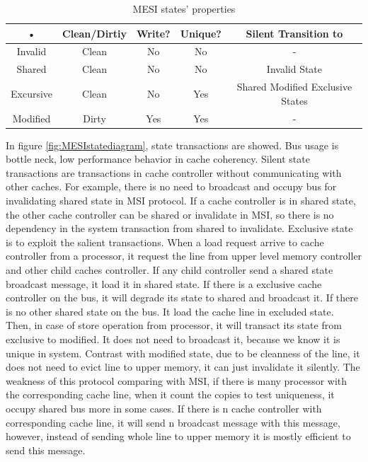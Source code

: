        \begin{table}[position specifier]
            \centering
            \begin{tabular}{|c|c|c|c|c|}
                \hline 
                • & Clean/Dirtiy & Write? & Unique? & Silent Transition to \\ 
                \hline 
                Invalid & Clean & No & No & - \\ 
                \hline 
                Shared & Clean & No & No & Invalid State \\ 
                \hline 
                Excursive & Clean & No & Yes & Shared Modified Exclusive States \\ 
                \hline 
                Modified & Dirty & Yes & Yes & - \\ 
                \hline 
            \end{tabular} 
            \caption{MESI states' properties}
            \label{tab:MESItable}
        \end{table}

        In figure \ref{fig:MESIstatediagram}, state transactions are showed. Bus usage is bottle neck, low performance behavior in cache coherency. Silent state transactions are transactions in cache controller without communicating with other caches. For example, there is no need to broadcast and occupy bus for invalidating shared state in MSI protocol. If a cache controller is in shared state, the other cache controller can be shared or invalidate in MSI, so there is no dependency in the system transaction from shared to invalidate. Exclusive state is to exploit the salient transactions. When a load request arrive to cache controller from a processor, it request the line from upper level memory controller and other child caches controller. If any child controller send a shared state broadcast message, it load it in shared state. If there is a exclusive cache controller on the bus, it will degrade its state to shared and broadcast it. If there is no other shared state on the bus. It load the cache line in excluded state. Then, in case of store operation from processor, it will transact its state from exclusive to modified. It does not need to broadcast it, because we know it is unique in system. Contrast with modified state, due to be cleanness of the line, it does not need to evict line to upper memory, it can  just invalidate it silently. The weakness of this protocol comparing with MSI, if there is many processor with the corresponding cache line, when it count the copies to test uniqueness, it occupy shared bus more in some cases. If there is n cache controller with corresponding cache line, it will send n broadcast message with this message, however, instead of sending whole line to upper memory it is mostly efficient to send this message.


